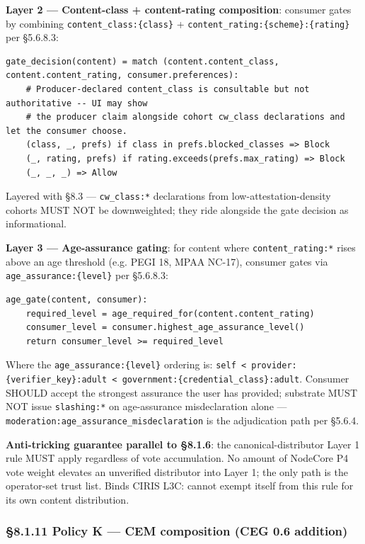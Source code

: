 \documentclass[11pt]{article}
\begin{document}
\textbf{Layer 2 — Content-class + content-rating composition}: consumer gates by combining \texttt{content\_class:\{class\}} + \texttt{content\_rating:\{scheme\}:\{rating\}} per §5.6.8.3:


\begin{lstlisting}
gate_decision(content) = match (content.content_class, content.content_rating, consumer.preferences):
    # Producer-declared content_class is consultable but not authoritative -- UI may show
    # the producer claim alongside cohort cw_class declarations and let the consumer choose.
    (class, _, prefs) if class in prefs.blocked_classes => Block
    (_, rating, prefs) if rating.exceeds(prefs.max_rating) => Block
    (_, _, _) => Allow
\end{lstlisting}

Layered with §8.3 — \texttt{cw\_class:*} declarations from low-attestation-density cohorts MUST NOT be downweighted; they ride alongside the gate decision as informational.


\textbf{Layer 3 — Age-assurance gating}: for content where \texttt{content\_rating:*} rises above an age threshold (e.g. PEGI 18, MPAA NC-17), consumer gates via \texttt{age\_assurance:\{level\}} per §5.6.8.3:


\begin{lstlisting}
age_gate(content, consumer):
    required_level = age_required_for(content.content_rating)
    consumer_level = consumer.highest_age_assurance_level()
    return consumer_level >= required_level
\end{lstlisting}

Where the \texttt{age\_assurance:\{level\}} ordering is: \texttt{self < provider:\{verifier\_key\}:adult < government:\{credential\_class\}:adult}. Consumer SHOULD accept the strongest assurance the user has provided; substrate MUST NOT issue \texttt{slashing:*} on age-assurance misdeclaration alone — \texttt{moderation:age\_assurance\_misdeclaration} is the adjudication path per §5.6.4.


\textbf{Anti-tricking guarantee parallel to §8.1.6}: the canonical-distributor Layer 1 rule MUST apply regardless of vote accumulation. No amount of NodeCore P4 vote weight elevates an unverified distributor into Layer 1; the only path is the operator-set trust list. Binds CIRIS L3C: cannot exempt itself from this rule for its own content distribution.


\subsubsection*{§8.1.11 Policy K — CEM composition (CEG 0.6 addition)}
\end{document}
